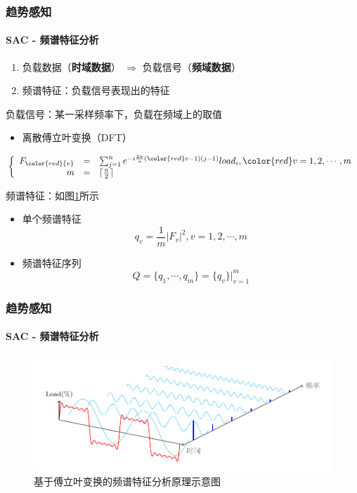 \begin{frame}
\frametitle{趋势感知}
\framesubtitle{SAC - 频谱特征分析}
\begin{enumerate}[1]
    \item 负载数据（\textbf{时域数据}） $\Rightarrow$ 负载信号（\textbf{频域数据}）
    \item 频谱特征：负载信号表现出的特征
\end{enumerate}
\begin{block}{负载信号：某一采样频率下，负载在频域上的取值}
    \begin{itemize}
    \item 离散傅立叶变换（DFT）
    \end{itemize}
    \begin{equation}
    \left\{
        \begin{array}{rcl}
        F_{\color{red}{v}} &=& \sum_{j=1}^{n} e^{-i\frac{2\pi}{n}({\color{red}v}-1)(j-1)}load_i,
        {\color{red}v=1,2,\cdots,m} \\
        m &=& \lceil \frac{n}{2} \rceil
        \end{array}
    \right.
    \end{equation}
\end{block}
\begin{block}{频谱特征：如图\ref{fig:fig9}所示}
\begin{itemize}
    \item 单个频谱特征
    \begin{equation}
        q_v = \frac{1}{m}\left|F_v \right|^2,v=1,2,\cdots,m
    \end{equation}
    \item 频谱特征序列
    \begin{equation}
        Q = \{q_1,\cdots,q_m\} = \{q_v\}|^m_{v=1}
    \end{equation}
\end{itemize}
\end{block}
\bigskip
\end{frame}

\begin{frame}
\frametitle{趋势感知}
\framesubtitle{SAC - 频谱特征分析}
\begin{figure}[htb]
\centering
\includegraphics[scale=0.7]{figures/fig9_dft.pdf}
\caption{基于傅立叶变换的频谱特征分析原理示意图}
\label{fig:fig9}
\end{figure}
\end{frame}

